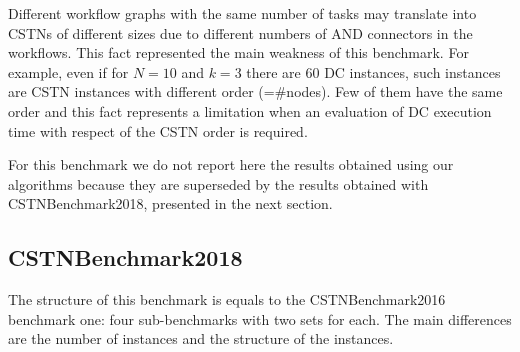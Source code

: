 \documentclass[a4paper,11pt]{article}
\begin{document}
\smallskip
Different workflow graphs with the same number of tasks may translate into CSTNs of different sizes due to different numbers of AND connectors in the workflows.
This fact represented the main weakness of this benchmark. 
For example, even if for $N=10$ and $k=3$ there are 60 DC instances, such instances are CSTN instances with different order (=\#nodes). Few of them have the same order and this fact  represents a limitation when an evaluation of DC execution time with respect of the CSTN order is required. 

For this benchmark we do not report here the results obtained using our algorithms because they are superseded by the results obtained with CSTNBenchmark2018, presented in the next section.


\subsection{CSTNBenchmark2018}

The structure of this benchmark is equals to the CSTNBenchmark2016 benchmark one: four sub-benchmarks with two sets for each. 
The main differences are the number of instances and the structure of the instances.
\end{document}
